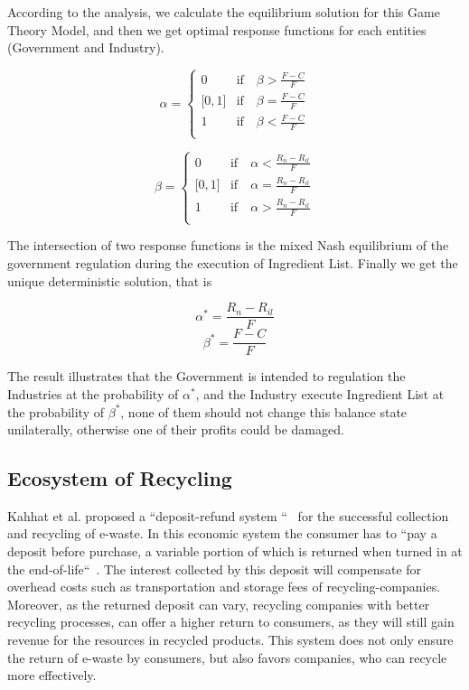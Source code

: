 According to the \cite{chenlihong} analysis, we calculate the equilibrium solution for this Game Theory Model, 
and then we get optimal response functions for each entities (Government and Industry).

\begin{equation}
\alpha = \left\{
\begin{array}{ll}
0 & \text{if} \quad \beta > \frac{F-C}{F} \\
\lbrack 0, 1 \rbrack & \text{if} \quad \beta = \frac{F-C}{F} \\
1 & \text{if} \quad \beta < \frac{F-C}{F} \\
\end{array}
\right.
\end{equation}

\begin{equation}
\beta = \left\{
\begin{array}{ll}
0 & \text{if} \quad \alpha < \frac{R_n-R_{il}}{F} \\
\lbrack 0, 1 \rbrack & \text{if} \quad \alpha = \frac{R_n-R_{il}}{F} \\
1 & \text{if} \quad \alpha > \frac{R_n-R_{il}}{F} \\
\end{array}
\right.
\end{equation}


The intersection of two response functions is the mixed Nash equilibrium of the government regulation 
during the execution of Ingredient List. Finally we get the unique deterministic solution, that is 

\[
\alpha^* = \frac{R_n - R_{il}}{F}
\]
\[
\beta^* =  \frac{F - C}{F}
\]

The result illustrates that the Government is intended to regulation the Industries at the probability of $\alpha^*$, 
and the Industry execute Ingredient List at the probability of $\beta^*$, none of them should not 
change this balance state unilaterally, otherwise one of their profits could be damaged.
 
\subsection{Ecosystem of Recycling}
Kahhat et al. proposed a ``deposit-refund system ``~\cite{kahhat2008exploring} for the successful collection and 
recycling of e-waste. In this economic system the consumer has to 
``pay a deposit before purchase, a variable portion of which is returned when turned in at the end-of-life``~\cite{plambeck2009effects}. 
The interest collected by this deposit will compensate for overhead costs such as transportation 
and storage fees of recycling-companies. Moreover, as the returned deposit can vary, 
recycling companies with better recycling processes, can offer a higher return to consumers, 
as they will still gain revenue for the resources in recycled products. 
This system does not only ensure the return of e-waste by consumers, 
but also favors companies, who can recycle more effectively.

